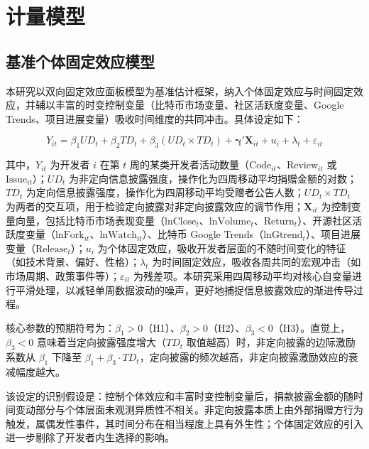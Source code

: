 \section{计量模型}
\label{sec:model-1}

\subsection{基准个体固定效应模型}
\label{sec:fe-model}

本研究以双向固定效应面板模型为基准估计框架，纳入个体固定效应与时间固定效应，并辅以丰富的时变控制变量（比特币市场变量、社区活跃度变量、Google Trends、项目进展变量）吸收时间维度的共同冲击。具体设定如下：

\begin{equation}
\label{eq:fe-model}
Y_{it} = \beta_1 UD_t + \beta_2 TD_t
       + \beta_3 (UD_t \times TD_t)
       + \boldsymbol{\gamma}' \mathbf{X}_{it} + u_i + \lambda_t + \varepsilon_{it}
\end{equation}

其中，$Y_{it}$ 为开发者 $i$ 在第 $t$ 周的某类开发者活动数量（$\text{Code}_{it}$、$\text{Review}_{it}$ 或 $\text{Issue}_{it}$）；$UD_t$ 为非定向信息披露强度，操作化为四周移动平均捐赠金额的对数；$TD_t$ 为定向信息披露强度，操作化为四周移动平均受赠者公告人数；$UD_t \times TD_t$ 为两者的交互项，用于检验定向披露对非定向披露效应的调节作用；$\mathbf{X}_{it}$ 为控制变量向量，包括比特币市场表现变量（$\text{lnClose}_t$、$\text{lnVolume}_t$、$\text{Return}_t$）、开源社区活跃度变量（$\text{lnFork}_{it}$、$\text{lnWatch}_{it}$）、比特币 Google Trends（$\text{lnGtrend}_t$）、项目进展变量（$\text{Release}_t$）；$u_i$ 为个体固定效应，吸收开发者层面的不随时间变化的特征（如技术背景、偏好、性格）；$\lambda_t$ 为时间固定效应，吸收各周共同的宏观冲击（如市场周期、政策事件等）；$\varepsilon_{it}$ 为残差项。本研究采用四周移动平均对核心自变量进行平滑处理，以减轻单周数据波动的噪声，更好地捕捉信息披露效应的渐进传导过程。

核心参数的预期符号为：$\beta_1 > 0$（H1）、$\beta_2 > 0$（H2）、$\beta_3 < 0$（H3）。直觉上，$\beta_3 < 0$ 意味着当定向披露强度增大（$TD_t$ 取值越高）时，非定向披露的边际激励系数从 $\beta_1$ 下降至 $\beta_1 + \beta_3 \cdot TD_t$，定向披露的频次越高，非定向披露激励效应的衰减幅度越大。

该设定的识别假设是：控制个体效应和丰富时变控制变量后，捐款披露金额的随时间变动部分与个体层面未观测异质性不相关。非定向披露本质上由外部捐赠方行为触发，属偶发性事件，其时间分布在相当程度上具有外生性；个体固定效应的引入进一步剔除了开发者内生选择的影响。

